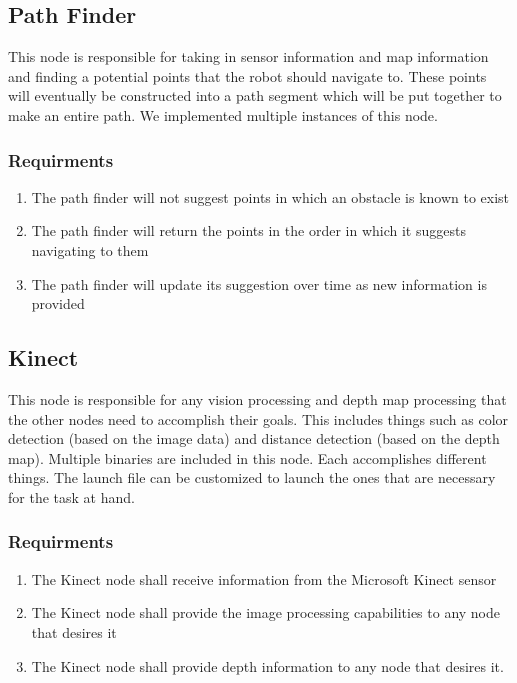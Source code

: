 \subsection{Path Finder}

This node is responsible for taking in sensor information and map information and finding a potential points that the robot should navigate to. These points will eventually be constructed into a path segment which will be put together to make an entire path. We implemented multiple instances of this node.

     \subsubsection{Requirments}
     \begin{enumerate}
       \item The path finder will not suggest points in which an obstacle is known to exist
       \item The path finder will return the points in the order in which it suggests navigating to
             them
       \item The path finder will update its suggestion over time as new information is provided
     \end{enumerate}
 
\subsection{Kinect}

This node is responsible for any vision processing and depth map processing that the other nodes need to accomplish their goals.  This includes things such as color detection (based on the image data) and distance detection (based on the depth map). Multiple binaries are included in this node. Each accomplishes different things. The launch file can be customized to launch the ones that are necessary for the task at hand.

  \subsubsection{Requirments}
  \begin{enumerate}
    \item The Kinect node shall receive information from the Microsoft Kinect sensor
    \item The Kinect node shall provide the image processing capabilities to any node that desires it
    \item The Kinect node shall provide depth information to any node that desires it.
  \end{enumerate}

